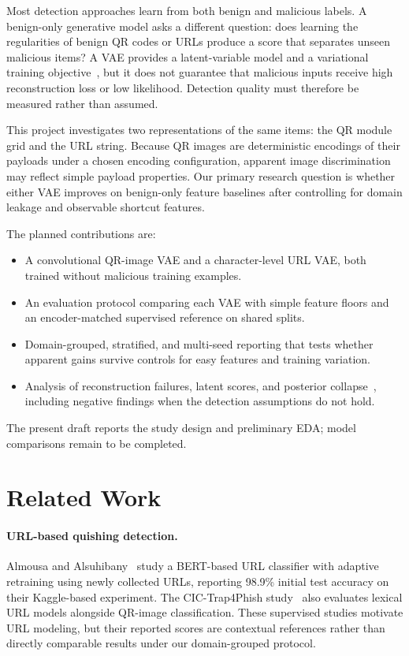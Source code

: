 \documentclass{article}
\begin{document}
Most detection approaches learn from both benign and malicious labels.
A benign-only generative model asks a different question: does learning the regularities of benign QR codes or URLs produce a score that separates unseen malicious items?
A VAE provides a latent-variable model and a variational training objective~\citep{kingma,rezende}, but it does not guarantee that malicious inputs receive high reconstruction loss or low likelihood.
Detection quality must therefore be measured rather than assumed.

This project investigates two representations of the same items: the QR module grid and the URL string.
Because QR images are deterministic encodings of their payloads under a chosen encoding configuration, apparent image discrimination may reflect simple payload properties.
Our primary research question is whether either VAE improves on benign-only feature baselines after controlling for domain leakage and observable shortcut features.

The planned contributions are:
\begin{itemize}
  \item A convolutional QR-image VAE and a character-level URL VAE, both trained without malicious training examples.
  \item An evaluation protocol comparing each VAE with simple feature floors and an encoder-matched supervised reference on shared splits.
  \item Domain-grouped, stratified, and multi-seed reporting that tests whether apparent gains survive controls for easy features and training variation.
  \item Analysis of reconstruction failures, latent scores, and posterior collapse~\citep{bowman}, including negative findings when the detection assumptions do not hold.
\end{itemize}
The present draft reports the study design and preliminary EDA; model comparisons remain to be completed.

\section{Related Work}

\paragraph{URL-based quishing detection.}
Almousa and Alsuhibany~\citep{almousa} study a BERT-based URL classifier with adaptive retraining using newly collected URLs, reporting 98.9\% initial test accuracy on their Kaggle-based experiment.
The CIC-Trap4Phish study~\citep{nejati} also evaluates lexical URL models alongside QR-image classification.
These supervised studies motivate URL modeling, but their reported scores are contextual references rather than directly comparable results under our domain-grouped protocol.
\end{document}
